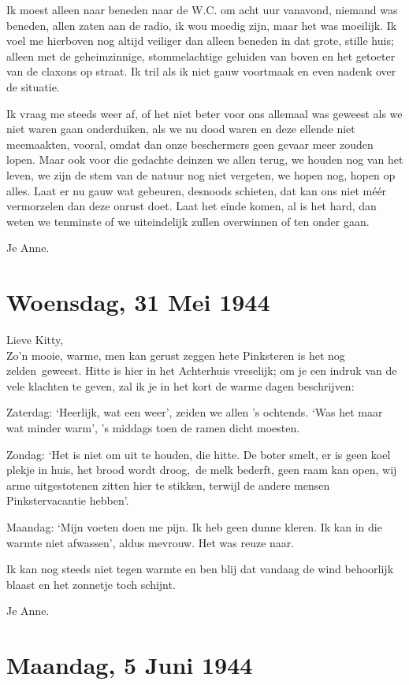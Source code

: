 \documentclass{book}
\begin{document}
Ik moest alleen naar beneden naar de W.C. om acht uur vanavond, niemand was
beneden, allen zaten aan de radio, ik wou moedig zijn, maar het was moeilijk. Ik
voel me hierboven nog altijd veiliger dan alleen beneden in dat grote, stille
huis; alleen met de geheimzinnige, stommelachtige geluiden van boven en het
getoeter van de claxons op straat. Ik tril als ik niet gauw voortmaak en even
nadenk over de situatie.

Ik vraag me steeds weer af, of het niet beter voor ons allemaal was geweest als
we niet waren gaan onderduiken, als we nu dood waren en deze ellende niet
meemaakten, vooral, omdat dan onze beschermers geen gevaar meer zouden lopen.
Maar ook voor die gedachte deinzen we allen terug, we houden nog van het leven,
we zijn de stem van de natuur nog niet vergeten, we hopen nog, hopen op alles.
Laat er nu gauw wat gebeuren, desnoods schieten, dat kan ons niet méér
vermorzelen dan deze onrust doet. Laat het einde komen, al is het hard, dan
weten we tenminste of we uiteindelijk zullen overwinnen of ten onder gaan.

Je Anne.

\section*{Woensdag, 31 Mei 1944}

Lieve Kitty,\\
Zo'n mooie, warme, men kan gerust zeggen hete Pinksteren is het
nog zelden~geweest. Hitte is hier in het Achterhuis vreselijk; om je een indruk
van de vele klachten te geven, zal ik je in het kort de warme dagen beschrijven:

Zaterdag: `Heerlijk, wat een weer', zeiden we allen 's ochtends. `Was het maar
wat minder warm', 's middags toen de ramen dicht moesten.

Zondag: `Het is niet om uit te houden, die hitte. De boter smelt, er is geen
koel plekje in huis, het brood wordt droog,~de melk bederft, geen raam kan open,
wij arme uitgestotenen zitten hier te stikken, terwijl de andere mensen
Pinkstervacantie hebben'.

Maandag: `Mijn voeten doen me pijn. Ik heb geen dunne kleren. Ik kan in die
warmte niet afwassen', aldus mevrouw. Het was reuze naar.

Ik kan nog steeds niet tegen warmte en ben blij dat vandaag de wind behoorlijk
blaast en het zonnetje toch schijnt.

Je Anne.

\section*{Maandag, 5 Juni 1944}
\end{document}
